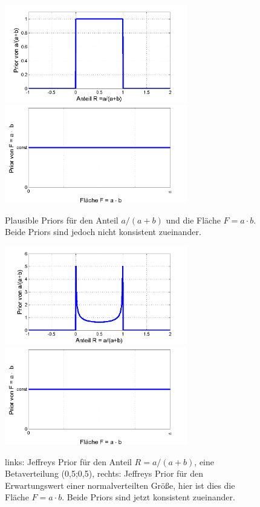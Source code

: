 \begin{figure}[!h]
 	\begin{center}
		\includegraphics[width=80mm]{08_vorlesung/media/prior_des_Anteils_1.png}
		\includegraphics[width=80mm]{08_vorlesung/media/prior_der_Flaeche_1.png}
		\caption{Plausible Priors für den Anteil $a/(a+b)$ und die Fläche $F = a\cdot b.$ Beide Priors sind jedoch nicht konsistent zueinander.} 
		\label{fig:Beispiel_Flaechenbestimmung_Verteilungen01} 
	\end{center}
\end{figure}
\begin{figure}[!ht]
	\begin{center}
		\includegraphics[width=80mm]{08_vorlesung/media/prior_des_Anteils_2.png}
		\includegraphics[width=80mm]{08_vorlesung/media/prior_der_Flaeche_2.png}
		\caption{ links: Jeffreys Prior für den Anteil $R=a/(a+b)$, eine Betaverteilung (0,5;0,5), rechts: Jeffreys Prior für den Erwartungswert einer normalverteilten Größe, hier ist dies die Fläche $F = a\cdot b.$ Beide Priors sind jetzt konsistent zueinander.}
		\label{fig:Beispiel_Flaechenbestimmung_Verteilungen02}
	\end{center}
\end{figure}
